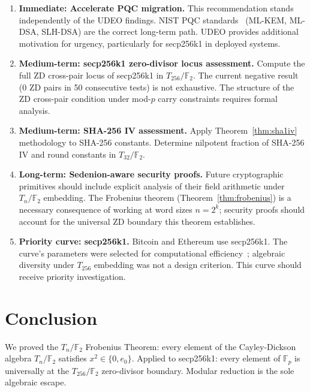 \documentclass[runningheads]{llncs}
\theoremstyle{plain}
\theoremstyle{definition}
\newcommand{\GFtwo}{\mathbb{F}_2}
\begin{document}
\begin{enumerate}
\item \textbf{Immediate: Accelerate PQC migration.}
      This recommendation stands independently of the UDEO findings.
      NIST PQC standards~\cite{NIST-PQC} (ML-KEM, ML-DSA, SLH-DSA) are
      the correct long-term path. UDEO provides additional motivation
      for urgency, particularly for secp256k1 in deployed systems.

\item \textbf{Medium-term: secp256k1 zero-divisor locus assessment.}
      Compute the full ZD cross-pair locus of secp256k1 in $T_{256}/\GFtwo$.
      The current negative result (0 ZD pairs in 50 consecutive tests) is
      not exhaustive. The structure of the ZD cross-pair condition under
      mod-$p$ carry constraints requires formal analysis.

\item \textbf{Medium-term: SHA-256 IV assessment.}
      Apply Theorem~\ref{thm:sha1iv} methodology to SHA-256 constants.
      Determine nil\-potent fraction of SHA-256 IV and round constants
      in $T_{32}/\GFtwo$.

\item \textbf{Long-term: Sedenion-aware security proofs.}
      Future cryptographic primitives should include explicit analysis of
      their field arithmetic under $T_n/\GFtwo$ embedding. The Frobenius
      theorem (Theorem~\ref{thm:frobenius}) is a necessary consequence of
      working at word sizes $n = 2^k$; security proofs should account for
      the universal ZD boundary this theorem establishes.

\item \textbf{Priority curve: secp256k1.}
      Bitcoin and Ethereum use secp256k1. The curve's parameters were
      selected for computational efficiency~\cite{SEC2}; algebraic
      diversity under $T_{256}$ embedding was not a design criterion.
      This curve should receive priority investigation.
\end{enumerate}


\section{Conclusion}
\label{sec:conclusion}

We proved the $T_n/\GFtwo$ Frobenius Theorem: every element of the
Cayley-Dickson algebra $T_n/\GFtwo$ satisfies $x^2 \in \{0, e_0\}$.
Applied to secp256k1: every element of $\mathbb{F}_p$ is universally at the
$T_{256}/\GFtwo$ zero-divisor boundary. Modular reduction is the sole
algebraic escape.
\end{document}
